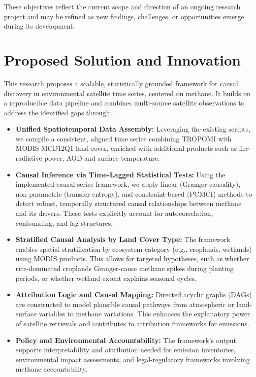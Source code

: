These objectives reflect the current scope and direction of an ongoing research project and may be refined as new findings, challenges, or opportunities emerge during its development.



\section{Proposed Solution and Innovation}
\label{subsec:proposed-solution}

This research proposes a scalable, statistically grounded framework for causal discovery in environmental satellite time series, centered on methane. It builds on a reproducible data pipeline and combines multi-source satellite observations to address the identified gaps through:

\begin{itemize}
    \item \textbf{Unified Spatiotemporal Data Assembly:} Leveraging the existing scripts, we compile a consistent, aligned time series combining TROPOMI  with MODIS MCD12Q1 land cover, enriched with additional products such as fire radiative power, AOD and surface temperature.

    \item \textbf{Causal Inference via Time-Lagged Statistical Tests:} Using the implemented causal series framework, we apply linear (Granger causality), non-parametric (transfer entropy), and constraint-based (PCMCI) methods to detect robust, temporally structured causal relationships between methane and its drivers. These tests explicitly account for autocorrelation, confounding, and lag structures.

    \item \textbf{Stratified Causal Analysis by Land Cover Type:} The framework enables spatial stratification by ecosystem category (e.g., croplands, wetlands) using MODIS products. This allows for targeted hypotheses, such as whether rice-dominated croplands Granger-cause methane spikes during planting periods, or whether wetland extent explains seasonal cycles.

    \item \textbf{Attribution Logic and Causal Mapping:} Directed acyclic graphs (DAGs) are constructed to model plausible causal pathways from atmospheric or land-surface variables to methane variations. This enhances the explanatory power of satellite retrievals and contributes to attribution frameworks for emissions.

    \item \textbf{Policy and Environmental Accountability:} The framework's output supports interpretability and attribution needed for emission inventories, environmental impact assessments, and legal-regulatory frameworks involving methane accountability.
\end{itemize}

